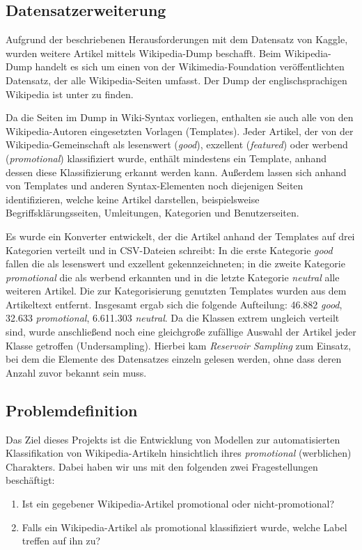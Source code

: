 \subsection{Datensatzerweiterung}
\label{ProblemeDatensatz}
\label{WPDump}
Aufgrund der beschriebenen Herausforderungen mit dem Datensatz von Kaggle, wurden weitere Artikel mittels Wikipedia-Dump beschafft. Beim Wikipedia-Dump handelt es sich um einen von der Wikimedia-Foundation veröffentlichten Datensatz, der alle Wikipedia-Seiten umfasst. Der Dump der englischsprachigen Wikipedia ist unter \cite{WpDump2024} zu finden.

Da die Seiten im Dump in Wiki-Syntax vorliegen, enthalten sie auch alle von den Wikipedia-Autoren eingesetzten Vorlagen (Templates). Jeder Artikel, der von der Wiki\-pedia-Gemeinschaft als lesenswert (\emph{good}), exzellent (\emph{featured}) oder werbend (\emph{promotional}) klassifiziert wurde, enthält mindestens ein Template, anhand dessen diese Klassifizierung erkannt werden kann. Außerdem lassen sich anhand von Templates und anderen Syntax-Elementen noch diejenigen Seiten identifizieren, welche keine Artikel darstellen, beispielsweise Begriffsklärungsseiten, Umleitungen, Kategorien und Benutzerseiten.

Es wurde ein Konverter entwickelt, der die Artikel anhand der Templates auf drei Kategorien verteilt und in CSV-Dateien schreibt: In die erste Kategorie \emph{good} fallen die als lesenswert und exzellent gekennzeichneten; in die zweite Kategorie \emph{promotional} die als werbend erkannten und in die letzte Kategorie \emph{neutral} alle weiteren Artikel. Die zur Kategorisierung genutzten Templates wurden aus dem Artikeltext entfernt. Insgesamt ergab sich die folgende Aufteilung: 46.882 \emph{good}, 32.633 \emph{promotional}, 6.611.303 \emph{neutral}. Da die Klassen extrem ungleich verteilt sind, wurde anschließend noch eine gleichgroße zufällige Auswahl der Artikel jeder Klasse getroffen (Undersampling). Hierbei kam \textit{Reservoir Sampling} \cite{Vitter1985} zum Einsatz, bei dem die Elemente des Datensatzes einzeln gelesen werden, ohne dass deren Anzahl zuvor bekannt sein muss.

\subsection{Problemdefinition}
\label{Problemdefinition}
Das Ziel dieses Projekts ist die Entwicklung von Modellen zur automatisierten Klassifikation von Wikipedia-Artikeln hinsichtlich ihres \textit{promotional} (werblichen) Charakters. Dabei haben wir uns mit den folgenden zwei Fragestellungen beschäftigt:
\begin{enumerate}
    \item Ist ein gegebener Wikipedia-Artikel promotional oder nicht-promotional?

    \item Falls ein Wikipedia-Artikel als promotional klassifiziert wurde, welche Label treffen auf ihn zu?
\end{enumerate}
